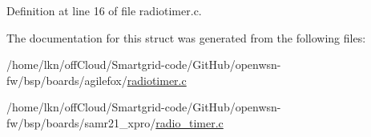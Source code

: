 Definition at line 16 of file radiotimer.\+c.



The documentation for this struct was generated from the following files\+:\begin{DoxyCompactItemize}
\item 
/home/lkn/off\+Cloud/\+Smartgrid-\/code/\+Git\+Hub/openwsn-\/fw/bsp/boards/agilefox/\hyperlink{agilefox_2radiotimer_8c}{radiotimer.\+c}\item 
/home/lkn/off\+Cloud/\+Smartgrid-\/code/\+Git\+Hub/openwsn-\/fw/bsp/boards/samr21\+\_\+xpro/\hyperlink{radio__timer_8c}{radio\+\_\+timer.\+c}\end{DoxyCompactItemize}
